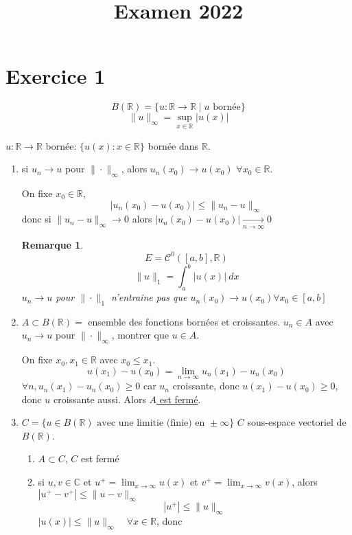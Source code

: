 \documentclass[a4paper]{article}
\title{Examen 2022}
\newcommand{\R}{\mathbb{R}}
\newtheorem*{remarque}{Remarque}
\begin{document}
\maketitle
\section*{Exercice 1} 
\[
    B(\R) = \{ u: \R \to \R \mid u \text{ bornée} \}
\] 
\[
\|u\|_{\infty} = \sup_{x \in \R} |u(x)|
\] 

$u: \R \to \R$ bornée: $\{ u(x): x \in \R \}$ bornée dans $\R$.
\begin{enumerate}
    \item si $u_n \to u$ pour $\|\cdot\|_{\infty}$, alors $u_n(x_0) \to u(x_0)$ $\forall x_0 \in \R$.
        \par
        On fixe $x_0 \in \R$,
        \[
        |u_n(x_0) - u(x_0)| \le \|u_n - u\|_{\infty}
        \] 
        donc si $\|u_n - u\|_{\infty} \to 0$ alors $|u_n(x_0) - u(x_0)| \xrightarrow[n \to \infty]{} 0$ 
        \begin{remarque}
        \[
            E = \mathcal{C}^0([a,b], \R)
        \] 
        \[
            \|u\|_1 = \int_{{a}}^{{b}} {|u(x)|} \: d{x}
        \] 
        $u_n \to u$ pour $\|\cdot \|_{1}$ n'entraine pas que $u_n(x_0) \to u(x_0) \forall x_0 \in [a, b]$ 
    \end{remarque}
    \item $A \subset B(\R) = $ ensemble des fonctions bornées et croissantes. $u_n \in A$ avec $u_n \to u$ pour $\|\cdot \|_{\infty}$, montrer que $u \in A$.
        \par
        On fixe $x_0, x_1 \in \R$ avec $x_0 \le x_1$. 
        \[
        u(x_1) - u(x_0) = \lim_{n \to \infty} u_n(x_1) - u_n(x_0)
        \] 
        $\forall n, u_n(x_1) - u_n(x_0) \ge 0$ car $u_n$ croissante, donc  $u(x_1) - u(x_0) \ge 0$, donc $u$ croissante aussi. Alors \underline{$A$ est fermé}.
    \item $C = \{ u \in B(\R) \text{ avec une limitie (finie) en } \pm\infty \}$ $C$ sous-espace vectoriel de $B(\R)$. 
        \begin{enumerate}
            \item 
                $A \subset C$, $C$ est fermé
            \item si  $u, v \in \mathbb{C}$ et $u^+ = \lim_{x \to \infty} u(x)$ et $v^+ = \lim_{x \to \infty} v(x)$, alors $|u^+ - v^+| \le \|u - v\|_{\infty}$
                \[
                |u^+| \le \|u\|_{\infty}
                \] 
                $|u(x)| \le \|u\|_{\infty} \quad \forall x \in \R$, donc 

\end{enumerate}
\end{enumerate}
\end{document}
